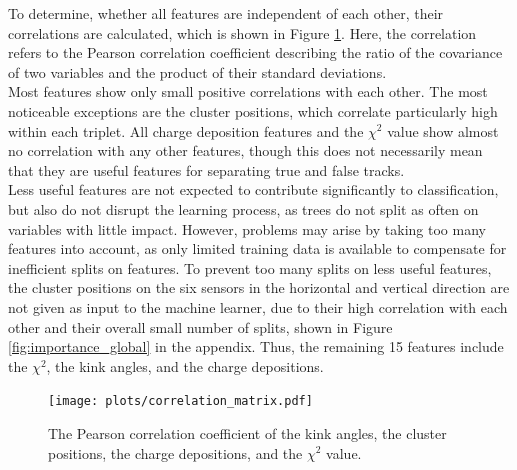 To determine, whether all features are independent of each other, their correlations are calculated, which is shown in Figure \ref{fig:corr}. Here, the correlation
refers to the Pearson correlation coefficient \cite{pearson} describing the ratio of the covariance of two variables and the product of their standard deviations. \\
Most features show only small positive correlations with each other. The most noticeable exceptions are the cluster positions, which correlate particularly high within each
triplet. All charge deposition features and the $\chi^2$ value show almost no correlation with any other features, though this does not necessarily mean that they are
useful features for separating true and false tracks. \\
Less useful features
are not expected to contribute significantly to classification, but also do not disrupt the learning process, as trees do not split as often on variables with little impact.
However, problems may arise by taking too many features into account, as only limited training data is available to compensate for inefficient splits on features.
To prevent too many splits on less useful features,
the cluster positions on the six sensors in the horizontal and vertical direction are not given as input to the machine learner,
due to their high correlation with each other and their overall small number of splits, shown in Figure \ref{fig:importance_global} in the appendix.
Thus, the remaining 15 features include the $\chi^2$, the kink angles, and the charge depositions.
\begin{figure}
  \hspace{-2.5cm}
  \texttt{[image: plots/correlation\_matrix.pdf]}
  \vspace{-1.8cm}
  \caption{The Pearson correlation coefficient of the kink angles, the cluster positions, the charge depositions, and the $\chi^2$ value.}
  \label{fig:corr}
\end{figure}

